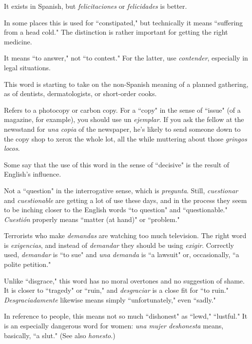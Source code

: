  It exists in Spanish, but \emph{felicitaciones}
or \emph{felicidades} is better.

 In some places this is used for ``constipated,"
but technically it means ``suffering from a head cold." The distinction
is rather important for getting the right medicine.

 It means ``to answer," not ``to contest." For the
latter, use \emph{contender}, especially in legal situations.

 This word is starting to take on the non-Spanish meaning of a planned gathering, as of dentists, dermatologists, or short-order cooks.

 Refers to a photocopy or carbon copy. For a ``copy" in
the sense of ``issue" (of a magazine, for example), you should use un
\emph{ejemplar}. If you ask the fellow at the newsstand for \emph{una copia} of the
newspaper, he's likely to send someone down to the copy shop to
xerox the whole lot, all the while muttering about those \emph{gringos
	locos}.

 Some say that the use of this word in the sense of
``decisive" is the result of English's influence.

 Not a ``question" in the interrogative sense,
which is \emph{pregunta}. Still, \emph{cuestionar} and \emph{cuestionable} are getting a
lot of use these days, and in the process they seem to be inching closer
to the English words ``to question" and ``questionable." \emph{Cuestión} properly means ``matter (at hand)" or ``problem."

 Terrorists who make \emph{demandas} are watching
too much television. The right word is \emph{exigencias}, and instead of
\emph{demandar} they should be using \emph{exigir}. Correctly used, \emph{demandar} is
``to sue" and \emph{una demanda} is ``a lawsuit" or, occasionally, ``a polite
petition."

 Unlike ``disgrace," this word has no moral overtones and no suggestion of shame. It is closer to ``tragedy" or ``ruin,"
and \emph{desgraciar} is a close fit for ``to ruin." \emph{Desgraciadamente} likewise
means simply ``unfortunately," even ``sadly."

 In reference to people, this means not so
much ``dishonest" as ``lewd," ``lustful." It is an especially dangerous
word for women: \emph{una mujer deshonesta} means, basically, ``a slut."
(See also \emph{honesto}.)

